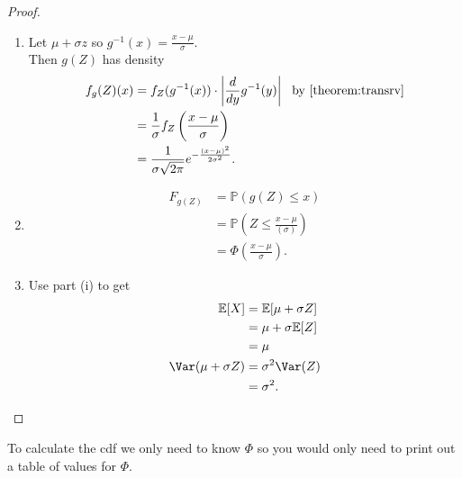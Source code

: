 \begin{proof} ~
    \begin{enumerate}
        \item Let $\mu + \sigma z$ so $g^{-1}(x) = \frac{x - \mu}{\sigma}$. \\
        Then $g(Z)$ has density 
        \begin{align*}
            f_g(Z)(x) &= f_Z(g^{-1}(x)) \cdot \left|\frac{d}{dy}g^{-1}(y)\right| \ \text{ by \Cref{theorem:transrv}} \\
            &= \frac{1}{\sigma} f_Z \left( \frac{x - \mu}{\sigma} \right) \\
            &= \frac{1}{\sigma \sqrt{2 \pi}} e^{- \frac{(x - \mu)^2}{2 \sigma^2}}.
        \end{align*}
        \item \begin{align*}
            F_{g(Z)} &= \mathbb{P}(g(Z) \leq x) \\
            &= \mathbb{P}(Z \leq \frac{x - \mu}{(\sigma)}) \\
            &= \Phi \left( \frac{x - \mu}{\sigma} \right).
        \end{align*} 
        \item Use part (i) to get
        \begin{align*}
            \mathbb{E}[X] &= \mathbb{E}[\mu + \sigma Z] \\
            &= \mu + \sigma \mathbb{E}[Z] \\
            &= \mu \\
            \Var(\mu + \sigma Z) &= \sigma^2 \Var(Z) \\
            &= \sigma^2.
        \end{align*} 
    \end{enumerate} 
\end{proof} 

\begin{remark}
    To calculate the cdf we only need to know $\Phi$ so you would only need to print out a table of values for $\Phi$.
\end{remark} 

